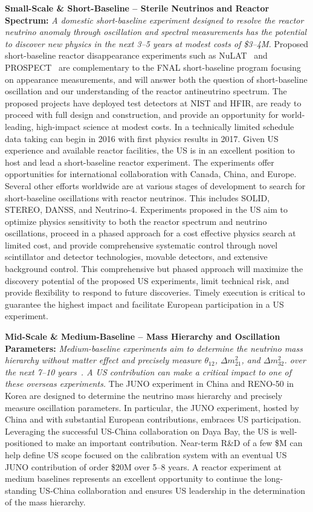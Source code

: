 {\bf Small-Scale \& Short-Baseline -- Sterile Neutrinos and Reactor Spectrum:}
{\em A domestic short-baseline experiment designed to resolve the
reactor neutrino anomaly through oscillation and spectral measurements
has the potential to discover new physics in the next 3--5 years at
modest costs of \$3--4M.}  Proposed short-baseline reactor
disappearance experiments such as NuLAT~\cite{Lane:2015alq} and
PROSPECT~\cite{Ashenfelter:2013oaa} are complementary to the FNAL
short-baseline program focusing on appearance measurements, and will
answer both the question of short-baseline oscillation and our
understanding of the reactor antineutrino spectrum. The proposed
projects have deployed test detectors at NIST and HFIR, are ready to
proceed with full design and construction, and provide an opportunity
for world-leading, high-impact science at modest costs. In a
technically limited schedule data taking can begin in 2016 with first
physics results in 2017. Given US experience and available reactor
facilities, the US is in an excellent position to host and lead a
short-baseline reactor experiment. The experiments offer opportunities
for international collaboration with Canada, China, and Europe.
Several other efforts worldwide are at various stages of development
to search for short-baseline oscillations with reactor neutrinos. This
includes SOLID, STEREO, DANSS, and Neutrino-4. Experiments proposed in
the US aim to optimize physics sensitivity to both the reactor
spectrum and neutrino oscillations, proceed in a phased approach for a
cost effective physics search at limited cost, and provide
comprehensive systematic control through novel scintillator and
detector technologies, movable detectors, and extensive background
control. This comprehensive but phased approach will maximize the
discovery potential of the proposed US experiments, limit technical
risk, and provide flexibility to respond to future discoveries.
Timely execution is critical to guarantee the highest impact and
facilitate European participation in a US experiment.

{\bf Mid-Scale \& Medium-Baseline -- Mass Hierarchy and Oscillation Parameters:}
 {\em Medium-baseline experiments aim to determine the
neutrino mass hierarchy without matter effect and precisely measure
$\theta_{12}$, $\Delta m^2_{21}$, and $\Delta m^2_{32}$. over the next
7--10 years~\cite{Kettell:2013eos}. A US contribution can make a critical impact to one of
these overseas experiments.} The JUNO experiment in China and RENO-50
in Korea are designed to determine the neutrino mass hierarchy and
precisely measure oscillation parameters. In particular, the JUNO
experiment, hosted by China and with substantial European
contributions, embraces US participation. Leveraging the successful
US-China collaboration on Daya Bay, the US is well-positioned to make
an important contribution.  Near-term R\&D of a few \$M can help
define US scope focused on the calibration system with an eventual US
JUNO contribution of order \$20M over 5--8 years.  A reactor
experiment at medium baselines represents an excellent opportunity to
continue the long-standing US-China collaboration and ensures US
leadership in the determination of the mass hierarchy.

